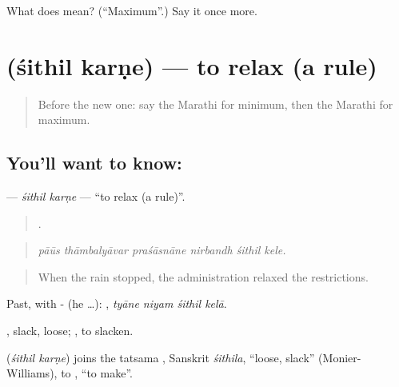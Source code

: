 \begin{tcolorbox}[breakable,colback=teal!4,colframe=teal!35!black,title={Before you move on}]
What does  mean? (\textquotedblleft{}Maximum\textquotedblright{}.) Say it once more.
\end{tcolorbox}
\section[\texorpdfstring{\mr{शिथिल} \mr{करणे} (śithil karṇe)}{शिथिल करणे (śithil karṇe)}]{  (śithil karṇe) — to relax (a rule)}

\label{lesson:MR-C379-sithil-karne}



\begin{quote}
Before the new one: say the Marathi for minimum, then the Marathi for maximum.
\end{quote}

\subsection*{You'll want to know:  }
\textbf{ } — \emph{śithil karṇe} — \textquotedblleft{}to relax (a rule)\textquotedblright{}.

\begin{quote}
     .
\end{quote}

\begin{quote}
\emph{pāūs thāmbalyāvar praśāsnāne nirbandh śithil kele.}
\end{quote}

\begin{quote}
When the rain stopped, the administration relaxed the restrictions.
\end{quote}

Past, with - (he …):    , \emph{tyāne niyam śithil kelā}.

, slack, loose;  , to slacken.

\begin{cousinweb}
\textbf{ } (\emph{śithil karṇe}) joins the tatsama , Sanskrit \emph{śithila}, \textquotedblleft{}loose, slack\textquotedblright{} (Monier-Williams), to , \textquotedblleft{}to make\textquotedblright{}.
\end{cousinweb}


